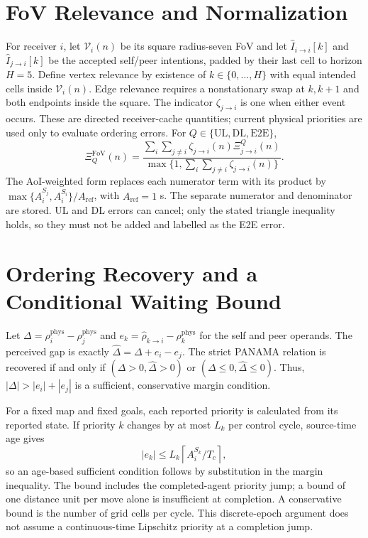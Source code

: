 \appendix
\section{FoV Relevance and Normalization}
For receiver $i$, let $\mathcal V_i(n)$ be its square radius-seven FoV and let $\widehat I_{i\to i}[k]$ and $\widehat I_{j\to i}[k]$ be the accepted self/peer intentions, padded by their last cell to horizon $H=5$. Define vertex relevance by existence of $k\in\{0,\ldots,H\}$ with equal intended cells inside $\mathcal V_i(n)$. Edge relevance requires a nonstationary swap at $k,k+1$ and both endpoints inside the square. The indicator $\zeta_{j\to i}$ is one when either event occurs. These are directed receiver-cache quantities; current physical priorities are used only to evaluate ordering errors.
For $Q\in\{\mathrm{UL},\mathrm{DL},\mathrm{E2E}\}$,
\begin{equation}
 \Xi_Q^{\mathrm{FoV}}(n)=
 \frac{\sum_i\sum_{j\ne i}\zeta_{j\to i}(n)\Xi^Q_{j\to i}(n)}
 {\max\{1,\sum_i\sum_{j\ne i}\zeta_{j\to i}(n)\}}.
\end{equation}
The AoI-weighted form replaces each numerator term with its product by $\max\{A_i^{S_j},A_i^{S_i}\}/A_{\mathrm{ref}}$, with $A_{\mathrm{ref}}=1$ s. The separate numerator and denominator are stored. UL and DL errors can cancel; only the stated triangle inequality holds, so they must not be added and labelled as the E2E error.

\section{Ordering Recovery and a Conditional Waiting Bound}
Let $\Delta=\rho_i^{\mathrm{phys}}-\rho_j^{\mathrm{phys}}$ and $e_k=\widehat\rho_{k\to i}-\rho_k^{\mathrm{phys}}$ for the self and peer operands. The perceived gap is exactly $\widehat\Delta=\Delta+e_i-e_j$. The strict PANAMA relation is recovered if and only if $(\Delta>0,\widehat\Delta>0)$ or $(\Delta\leq0,\widehat\Delta\leq0)$. Thus, $|\Delta|>|e_i|+|e_j|$ is a sufficient, conservative margin condition.

For a fixed map and fixed goals, each reported priority is calculated from its reported state. If priority $k$ changes by at most $L_k$ per control cycle, source-time age gives
\begin{equation}
 |e_k|\leq L_k\left\lceil A_i^{S_k}/T_c\right\rceil,
\end{equation}
so an age-based sufficient condition follows by substitution in the margin inequality. The bound includes the completed-agent priority jump; a bound of one distance unit per move alone is insufficient at completion. A conservative bound is the number of grid cells per cycle. This discrete-epoch argument does not assume a continuous-time Lipschitz priority at a completion jump.

